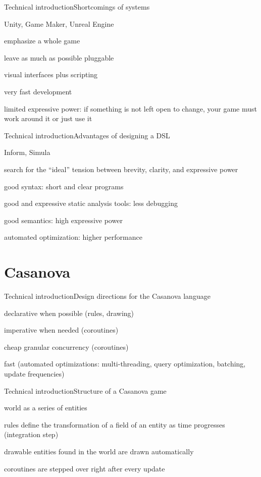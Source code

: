 \documentclass{beamer}
\begin{document}
\begin{slide}{Technical introduction}{Shortcomings of systems}{
\item Unity, Game Maker, Unreal Engine
\item emphasize a whole game
\item leave as much as possible pluggable
\item visual interfaces plus scripting
\item very fast development
\item limited expressive power: if something is not left open to change, your game must work around it or just use it
}\end{slide}

\begin{slide}{Technical introduction}{Advantages of designing a DSL}{
\item Inform, Simula
\item search for the ``ideal'' tension between brevity, clarity, and expressive power
\item good syntax: short and clear programs
\item good and expressive static analysis tools: less debugging
\item good semantics: high expressive power
\item automated optimization: higher performance
}\end{slide}


\section{Casanova}
\begin{slide}{Technical introduction}{Design directions for the Casanova language}{
\item declarative when possible (rules, drawing)
\item imperative when needed (coroutines)
\item cheap granular concurrency (coroutines)
\item fast (automated optimizations: multi-threading, query optimization, batching, update frequencies)
}\end{slide}


\begin{slide}{Technical introduction}{Structure of a Casanova game}{
\item world as a series of entities
\item rules define the transformation of a field of an entity as time progresses (integration step)
\item drawable entities found in the world are drawn automatically
\item coroutines are stepped over right after every update
}\end{slide}
\end{document}
